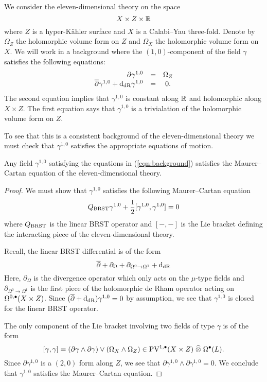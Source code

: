 \documentclass[11pt]{amsart}
\def\PV{{\rm PV}}
\begin{document}
We consider the eleven-dimensional theory on the space
\[
  X \times Z \times \mathbb R
\]
where $Z$ is a hyper-K\"{a}hler surface and $X$ is a Calabi--Yau three-fold.
Denote by $\Omega_Z$ the holomorphic volume form on $Z$ and $\Omega_X$ the holomorphic volume form on $X$.
We will work in a background where the $(1,0)$-component of the field $\gamma$ satisfies the following equations:
\begin{equation}\label{eqn:background}
  \begin{array}{rcccc}
    \partial \gamma^{1,0} & = & \Omega_Z \\
    \overline{\partial} \gamma^{1,0} + {\rm d}_{\rm dR} \gamma^{1,0} & = & 0 .
  \end{array}
\end{equation}
The second equation implies that $\gamma^{1,0}$ is constant along $\mathbb R$ and holomorphic along $X \times Z$.
The first equation says that $\gamma^{1,0}$ is a trivialation of the holomorphic volume form on $Z$.

To see that this is a consistent background of the eleven-dimensional theory we must check that $\gamma^{1,0}$ satisfies the appropriate equations of motion.

\begin{lem}
  Any field $\gamma^{1,0}$ satisfying the equations in (\ref{eqn:background}) satisfies the Maurer--Cartan equation of the eleven-dimensional theory.
\end{lem}

\begin{proof}
  We must show that $\gamma^{1,0}$ satisfies the following Maurer--Cartan equation
  \[
    Q_{\rm BRST} \gamma^{1,0} + \frac12 [\gamma^{1,0} ,\gamma^{1,0}] = 0
  \]
  where $Q_{\rm BRST}$ is the linear BRST operator and $[-,-]$ is the Lie bracket defining the interacting piece of the eleven-dimensional theory.

Recall, the linear BRST differential is of the form
  \[
    \overline{\partial} + \partial_{\Omega} + \partial_{\Omega^0 \to \Omega^1} + {\rm d}_{\rm dR}
  \]
  Here, $\partial_\Omega$ is the divergence operator which only acts on the $\mu$-type fields and $\partial_{\Omega^0 \to \Omega^1}$ is the first piece of the holomorphic de Rham operator acting on $\Omega^{0,\bullet}(X \times Z)$.
  Since $(\overline{\partial} + {\rm d}_{\rm dR}) \gamma^{1,0} = 0$ by assumption, we see that $\gamma^{1,0}$ is closed for the linear BRST operator.

The only component of the Lie bracket involving two fields of type $\gamma$ is of the form
  \[
    [\gamma, \gamma] = (\partial \gamma \wedge \partial \gamma) \vee (\Omega_X \wedge \Omega_Z) \in \PV^{1,\bu}(X \times Z) \; \Hat{\otimes} \; \Omega^\bu(L) .
  \]
  Since $\partial \gamma^{1,0}$ is a $(2,0)$ form along $Z$, we see that $\partial \gamma^{1,0} \wedge \partial \gamma^{1,0} =0$.
  We conclude that $\gamma^{1,0}$ satisfies the Maurer--Cartan equation.
\end{proof}
\end{document}
